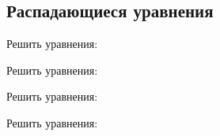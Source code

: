 \subsection*{Распадающиеся уравнения}
\begin{enumcols}[label=\arabf, start=3]
	\item Решить уравнения:
	\begin{enumcols}[columns=3]
		\item {}
		\item {}
		\item {}
		\item {}
		\item {}
		\item {}
		\item {}
	\end{enumcols}
	\item Решить уравнения:
	\begin{enumcols}[columns=3]
		\item {}
		\item {}
		\item {}
		\item {}
		\item {}
	\end{enumcols}
	\item Решить уравнения:
	\begin{enumcols}[columns=2]
		\item {}
		\item {}
	\end{enumcols}
	\item Решить уравнения:
	\begin{enumcols}[columns=2]
		\item {}
		\item {}
		\item {}
		\item {}
		\item {}
		\item {}
		\item {}
		\item {}
	\end{enumcols}
\end{enumcols}